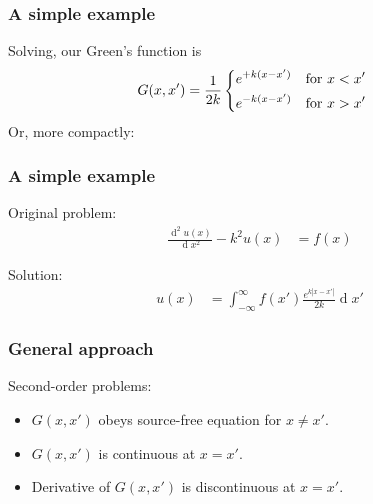 \documentclass[12 pt, compress, handout, intlimits]{beamer}
\renewcommand{\d}{\operatorname{d}}
\newcommand*\widefbox[1]{\fbox{\hspace{1em}#1\hspace{1em}}}
\begin{document}
\begin{frame}[fragile]
    \frametitle{A simple example}
    Solving, our Green's function is
    \begin{align*}
        G(x,x') &= \frac{1}{2k} 
        \begin{dcases} 
            e^{+k (x - x')} & \text{for } x < x'
            \\
            e^{-k (x - x')} & \text{for } x > x'
        \end{dcases}
    \end{align*}
    Or, more compactly:
    

\end{frame}

\note{
}

\begin{frame}[fragile]
    \frametitle{A simple example}

    Original problem:
    \begin{align*}
        \frac{\d^2 u(x)}{\d x^2} - k^2 u(x) &= f(x)
    \end{align*}

    Solution:
    \begin{align*}
        u(x) &= \int_{-\infty}^{\infty} f(x') \frac{e^{k|x - x'|}}{2k} \d x'
    \end{align*}
    
\end{frame}


\begin{frame}[fragile]
    \frametitle{General approach}

    Second-order problems:
    \begin{itemize}
    \item
        $ G(x,x') $ obeys source-free equation for $ x \neq x' $.
    \item
        $ G(x,x') $ is continuous at $ x = x' $.
    \item
        Derivative of $ G(x,x') $ is discontinuous at $ x = x' $.
    \end{itemize}
    
\end{frame}
\end{document}

